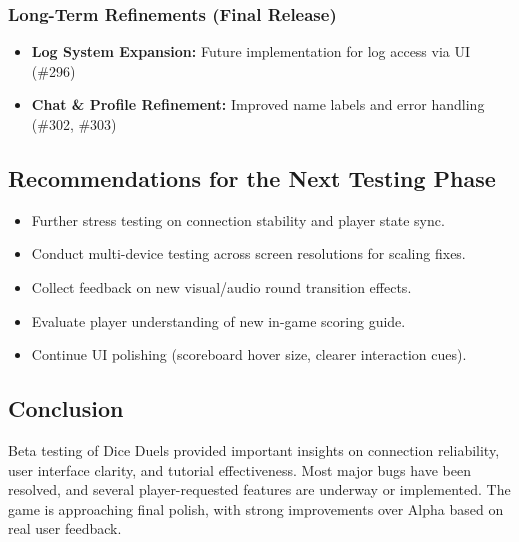 \documentclass{article}
\begin{document}
\subsubsection{Long-Term Refinements (Final Release)}
\begin{itemize}
    \item \textbf{Log System Expansion:} Future implementation for log access via UI (\#296)
    \item \textbf{Chat \& Profile Refinement:} Improved name labels and error handling (\#302, \#303)
\end{itemize}

\subsection{Recommendations for the Next Testing Phase}
\begin{itemize}
    \item Further stress testing on connection stability and player state sync.
    \item Conduct multi-device testing across screen resolutions for scaling fixes.
    \item Collect feedback on new visual/audio round transition effects.
    \item Evaluate player understanding of new in-game scoring guide.
    \item Continue UI polishing (scoreboard hover size, clearer interaction cues).
\end{itemize}

\subsection{Conclusion}
Beta testing of Dice Duels provided important insights on connection reliability, user interface clarity, and tutorial effectiveness. Most major bugs have been resolved, and several player-requested features are underway or implemented. The game is approaching final polish, with strong improvements over Alpha based on real user feedback.
\end{document}
